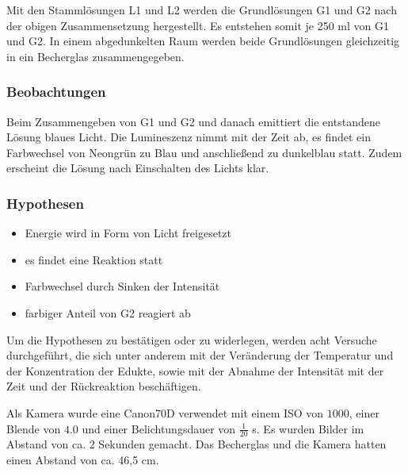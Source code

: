 Mit den Stammlösungen L1 und L2 werden die Grundlösungen G1 und G2 nach der obigen Zusammensetzung hergestellt. Es entstehen somit je 250 ml von G1 und G2. 
In einem abgedunkelten Raum werden beide Grundlösungen gleichzeitig in ein Becherglas zusammengegeben. 

\subsubsection*{Beobachtungen}
Beim Zusammengeben von G1 und G2 und danach emittiert die entstandene Lösung blaues Licht. Die Lumineszenz nimmt mit der Zeit ab, es findet ein Farbwechsel von Neongrün zu Blau und anschließend zu dunkelblau statt. Zudem erscheint die Lösung nach Einschalten des Lichts klar. 

\subsubsection*{Hypothesen}
\begin{itemize}
\item Energie wird in Form von Licht freigesetzt
\item es findet eine Reaktion statt
\item Farbwechsel durch Sinken der Intensität
\item farbiger Anteil von G2 reagiert ab
\end{itemize}

Um die Hypothesen zu bestätigen oder zu widerlegen, werden acht Versuche durchgeführt, die sich unter anderem mit der Veränderung der Temperatur und der Konzentration der Edukte, sowie mit der Abnahme der Intensität mit der Zeit und der Rückreaktion beschäftigen.

Als Kamera wurde eine Canon70D verwendet mit einem ISO von $1000$, einer Blende von $4.0$ und einer Belichtungsdauer von $\frac{1}{20}$ s. Es wurden Bilder im Abstand von ca. 2 Sekunden gemacht. Das Becherglas und die Kamera hatten einen Abstand von ca. 46,5 cm.
